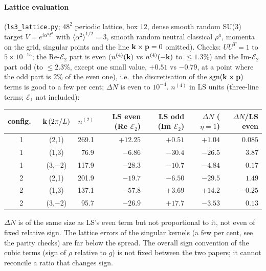 \paragraph{Lattice evaluation} (\texttt{ls3\_lattice.py}; $48^2$ periodic lattice, box $12$, dense smooth random SU(3) target $V=e^{i\alpha^at^a}$ with $\langle\alpha^2\rangle^{1/2}=3$, smooth random neutral classical $\rho^a$, momenta on the grid, singular points and the line $\mathbf{k}\times\mathbf{p}=0$ omitted). Checks: $U U^T=1$ to $5\times10^{-15}$; the Re-$\mathcal E_2$ part is even ($n^{(4)}(\mathbf{k})$ vs $n^{(4)}(-\mathbf{k})$ to $\le1.3\%$) and the Im-$\mathcal E_2$ part odd (to $\le2.3\%$, except one small value, $+0.51$ vs $-0.79$, at a point where the odd part is $2\%$ of the even one), i.e.\ the discretisation of the ${\rm sgn}(\mathbf{k}\times\mathbf{p})$ terms is good to a few per cent; $\Delta N$ is even to $10^{-4}$. $n^{(4)}$ in LS units (three-line terms; $\mathcal E_1$ not included):
\begin{center}\small\renewcommand{\arraystretch}{1.15}
\begin{tabular}{|c|c|r|r|r|r|r|}\hline
config.\ & $\mathbf{k}\,(2\pi/L)$ & $n^{(2)}$ & LS even (Re $\mathcal E_2$) & LS odd (Im $\mathcal E_2$) & $\Delta N$ ($\eta{=}1$) & $\Delta N$/LS even\\\hline
1&(2,1)&269.1&$+12.25$&$+0.51$&$+1.04$&$0.085$\\
1&(1,3)&76.9&$-6.86$&$-30.4$&$-26.5$&$3.87$\\
1&(3,$-$2)&117.9&$-28.3$&$-10.7$&$-4.84$&$0.17$\\
2&(2,1)&201.9&$-19.7$&$-6.50$&$-29.5$&$1.49$\\
2&(1,3)&137.1&$-57.8$&$+3.69$&$+14.2$&$-0.25$\\
2&(3,$-$2)&95.7&$-26.9$&$+17.7$&$-3.53$&$0.13$\\\hline
\end{tabular}\end{center}
$\Delta N$ is of the same size as LS's even term but not proportional to it, not even of fixed relative sign. The lattice errors of the singular kernels (a few per cent, see the parity checks) are far below the spread. The overall sign convention of the cubic terms (sign of $\rho$ relative to $g$) is not fixed between the two papers; it cannot reconcile a ratio that changes sign.

